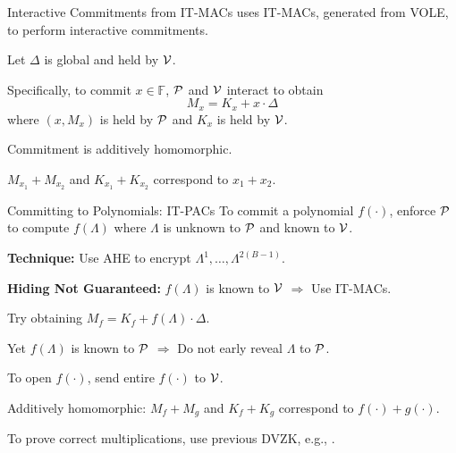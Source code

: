 \begin{frame}{Interactive Commitments from IT-MACs}
	\cite{BaumMRS21, YangSWW21, DittmerIO21} uses IT-MACs, generated from VOLE, to perform interactive commitments. 
	
	Let  $\Delta$ is global and held by $\mathcal{V}$.
	
	Specifically, to commit $x \in \mathbb{F}$,  $\mathcal{P}$ and $\mathcal{V}$ interact to obtain
	\begin{equation*}
		M_x = K_x + x\cdot \Delta
	\end{equation*}
	where $(x, M_x)$ is held by $\mathcal{P}$ and $K_x$ is held by $\mathcal{V}$.
	
	Commitment is additively homomorphic. 
	
	$M_{x_1} + M_{x_2}$ and $K_{x_1} + K_{x_2}$ correspond to $x_1 + x_2$.
\end{frame}
\begin{frame}{Committing to Polynomials: IT-PACs}
	To commit a polynomial $f(\cdot)$, enforce $\mathcal{P}$ to compute $f(\Lambda)$ where $\Lambda$ is unknown to $\mathcal{P}$ and known to $\mathcal{V}$.
	
	\textbf{Technique:} Use AHE to encrypt $\Lambda^1, \dots, \Lambda^{2(B - 1)}$.
	
	\textbf{Hiding Not Guaranteed:} $f(\Lambda)$ is known to $\mathcal{V}$ $\Rightarrow$ Use IT-MACs.
	
	Try obtaining $M_f = K_f + f(\Lambda) \cdot \Delta$.
	
	Yet $f(\Lambda)$ is known to $\mathcal{P}$ $\Rightarrow$ Do not early reveal $\Lambda$ to $\mathcal{P}$.
	
	To open $f(\cdot)$, send entire $f(\cdot)$ to $\mathcal{V}$.
	
	Additively homomorphic: $M_{f} + M_{g}$ and $K_{f} + K_{g}$ correspond to $f(\cdot) + g(\cdot)$.
	
	To prove correct multiplications, use previous DVZK, e.g., \cite{YangSWW21}.
\end{frame}